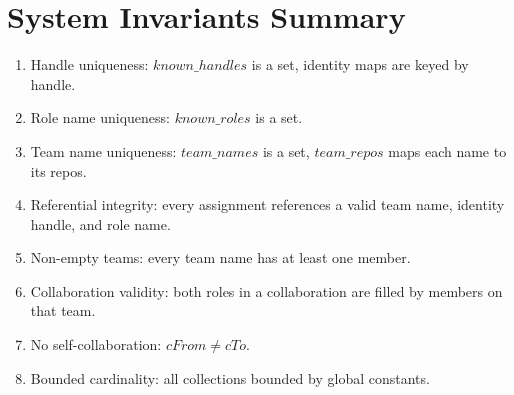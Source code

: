 \documentclass[a4paper,10pt,fleqn]{article}
\begin{document}
\section{System Invariants Summary}

\begin{enumerate}
  \item Handle uniqueness: $known\_handles$ is a set, identity maps
    are keyed by handle.
  \item Role name uniqueness: $known\_roles$ is a set.
  \item Team name uniqueness: $team\_names$ is a set, $team\_repos$
    maps each name to its repos.
  \item Referential integrity: every assignment references a valid
    team name, identity handle, and role name.
  \item Non-empty teams: every team name has at least one member.
  \item Collaboration validity: both roles in a collaboration are
    filled by members on that team.
  \item No self-collaboration: $cFrom \neq cTo$.
  \item Bounded cardinality: all collections bounded by global constants.
\end{enumerate}
\end{document}
